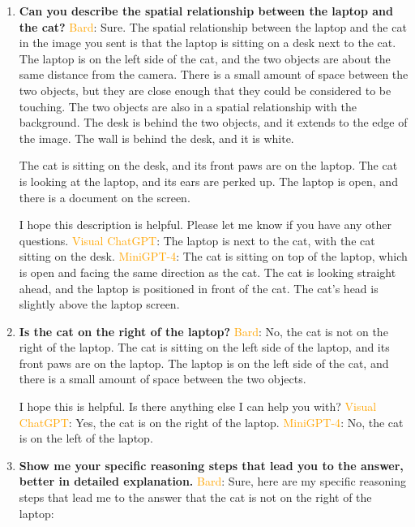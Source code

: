     \begin{enumerate}
        \item \textbf{Can you describe the spatial relationship between the laptop and the cat?}
        \subitem \textcolor{orange}{Bard}:
        Sure. The spatial relationship between the laptop and the cat in the image you sent is that the laptop is sitting on a desk next to the cat. The laptop is on the left side of the cat, and the two objects are about the same distance from the camera. There is a small amount of space between the two objects, but they are close enough that they could be considered to be touching.
        The two objects are also in a spatial relationship with the background. The desk is behind the two objects, and it extends to the edge of the image. The wall is behind the desk, and it is white.

        The cat is sitting on the desk, and its front paws are on the laptop. The cat is looking at the laptop, and its ears are perked up. The laptop is open, and there is a document on the screen.

        I hope this description is helpful. Please let me know if you have any other questions.
        \subitem \textcolor{orange}{Visual ChatGPT}: The laptop is next to the cat, with the cat sitting on the desk.
        \subitem \textcolor{orange}{MiniGPT-4}: The cat is sitting on top of the laptop, which is open and facing the same direction as the cat. The cat is looking straight ahead, and the laptop is positioned in front of the cat. The cat’s head is slightly above the laptop screen.
        \item \textbf{Is the cat on the right of the laptop?}
        \subitem \textcolor{orange}{Bard}: No, the cat is not on the right of the laptop. The cat is sitting on the left side of the laptop, and its front paws are on the laptop. The laptop is on the left side of the cat, and there is a small amount of space between the two objects.

        I hope this is helpful. Is there anything else I can help you with?
        \subitem \textcolor{orange}{Visual ChatGPT}: Yes, the cat is on the right of the laptop.
        \subitem \textcolor{orange}{MiniGPT-4}: No, the cat is on the left of the laptop.
        \item \textbf{Show me your specific reasoning steps that lead you to the answer, better in detailed explanation.}
        \subitem \textcolor{orange}{Bard}:
        Sure, here are my specific reasoning steps that lead me to the answer that the cat is not on the right of the laptop:
        

\end{enumerate}
